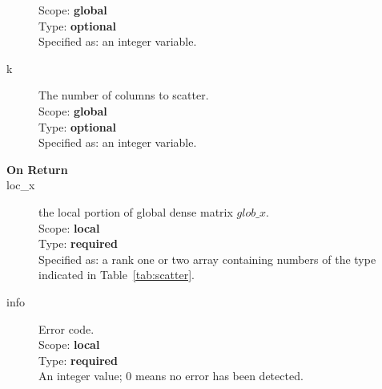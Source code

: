 \begin{description}
Scope: {\bf global} \\
Type: {\bf optional}\\
Specified as: an integer variable.
\item[k]  The number of columns to scatter.\\
Scope: {\bf global} \\
Type: {\bf optional}\\
Specified as: an integer variable. 
\item[\bf On Return] 
\item[loc\_x] the local portion of global dense matrix
$glob\_x$. \\
Scope: {\bf local} \\
Type: {\bf required}\\
Specified as: a rank one or two array containing numbers of the type
indicated in Table~\ref{tab:scatter}.
\item[info] Error code.\\
Scope: {\bf local} \\
Type: {\bf required} \\
An integer value; 0 means no error has been detected. 
\end{description}

